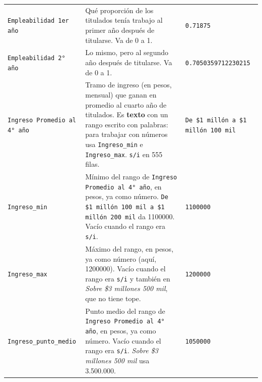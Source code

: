 \documentclass[10.5pt]{article}
\begin{document}
\begin{xltabular}{\linewidth}{@{}p{4.5cm} >{\raggedright\arraybackslash}X p{3.4cm}@{}}
\texttt{Empleabilidad 1er año} & Qué proporción de los titulados tenía trabajo al primer año después de titularse. Va de 0 a 1. & \texttt{0.71875} \\
\texttt{Empleabilidad 2° año} & Lo mismo, pero al segundo año después de titularse. Va de 0 a 1. & \texttt{0.7050359712230215} \\
\texttt{Ingreso Promedio al 4° año} & Tramo de ingreso (en pesos, mensual) que ganan en promedio al cuarto año de titulados. Es \textbf{texto} con un rango escrito con palabras: para trabajar con números usa \texttt{Ingreso\_\allowbreak{}min} e \texttt{Ingreso\_\allowbreak{}max}. \texttt{s/\allowbreak{}i} en 555 filas. & \texttt{De \$1 millón a \$1 millón 100 mil} \\
\texttt{Ingreso\_\allowbreak{}min} & Mínimo del rango de \texttt{Ingreso Promedio al 4° año}, en pesos, ya como número. \texttt{De \$1 millón 100 mil a \$1 millón 200 mil} da 1100000. Vacío cuando el rango era \texttt{s/\allowbreak{}i}. & \texttt{1100000} \\
\texttt{Ingreso\_\allowbreak{}max} & Máximo del rango, en pesos, ya como número (aquí, 1200000). Vacío cuando el rango era \texttt{s/\allowbreak{}i} y también en \emph{Sobre \$3 millones 500 mil}, que no tiene tope. & \texttt{1200000} \\
\texttt{Ingreso\_\allowbreak{}punto\_\allowbreak{}medio} & Punto medio del rango de \texttt{Ingreso Promedio al 4° año}, en pesos, ya como número. Vacío cuando el rango era \texttt{s/\allowbreak{}i}. \emph{Sobre \$3 millones 500 mil} usa 3.500.000. & \texttt{1050000} \\
\end{xltabular}
\end{document}
